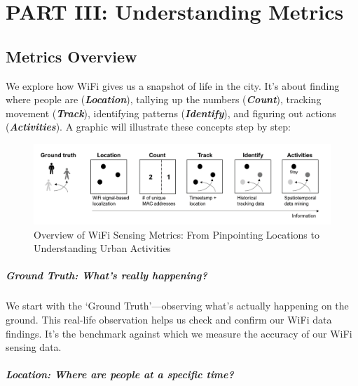 \documentclass[
  letterpaper,
]{scrbook}
\begin{document}
\part{PART III: Understanding Metrics}

\chapter{Metrics Overview}\label{metrics-overview}

We explore how WiFi gives us a snapshot of life in the city. It's about
finding where people are (\emph{\textbf{Location}}), tallying up the
numbers (\emph{\textbf{Count}}), tracking movement
(\emph{\textbf{Track}}), identifying patterns
(\emph{\textbf{Identify}}), and figuring out actions
(\emph{\textbf{Activities}}). A graphic will illustrate these concepts
step by step:

\begin{figure}[H]

{\centering \includegraphics{content/material/ch4/metric-overview.png}

}

\caption{Overview of WiFi Sensing Metrics: From Pinpointing Locations to
Understanding Urban Activities}

\end{figure}%

\subsubsection*{\texorpdfstring{\textbf{Ground Truth: What's really
happening?}}{Ground Truth: What's really happening?}}\label{ground-truth-whats-really-happening}

We start with the `Ground Truth'---observing what's actually happening
on the ground. This real-life observation helps us check and confirm our
WiFi data findings. It's the benchmark against which we measure the
accuracy of our WiFi sensing data.

\subsubsection*{\texorpdfstring{\textbf{Location: Where are people at a
specific
time?}}{Location: Where are people at a specific time?}}\label{location-where-are-people-at-a-specific-time}
\end{document}
